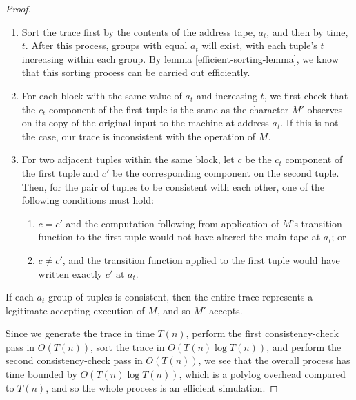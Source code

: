 \documentclass[english]{article}
\theoremstyle{plain}
\theoremstyle{definition}
\theoremstyle{plain}
\begin{document}
\begin{proof}
  \begin{enumerate}
  \item Sort the trace first by the contents of the address tape,
    $a_t$, and then by time, $t$. After this process, groups with
    equal $a_t$ will exist, with each tuple's $t$ increasing within
    each group. By lemma \ref{efficient-sorting-lemma}, we know that
    this sorting process can be carried out efficiently.
  \item For each block with the same value of $a_t$ and increasing
    $t$, we first check that the $c_t$ component of the first tuple is
    the same as the character $M'$ observes on its copy of the
    original input to the machine at address $a_t$. If this is not the
    case, our trace is inconsistent with the operation of $M$.
  \item For two adjacent tuples within the same block, let $c$ be the
    $c_t$ component of the first tuple and $c'$ be the corresponding
    component on the second tuple. Then, for the pair of tuples to be
    consistent with each other, one of the following conditions must
    hold:
    \begin{enumerate}
    \item $c = c'$ and the computation following from application of
      $M$'s transition function to the first tuple would not have
      altered the main tape at $a_t$; or
    \item $c \neq c'$, and the transition function applied to the
      first tuple would have written exactly $c'$ at $a_t$.
    \end{enumerate}
  \end{enumerate}

  If each $a_t$-group of tuples is consistent, then the entire trace
  represents a legitimate accepting execution of $M$, and so $M'$
  accepts.

  Since we generate the trace in time $T(n)$, perform the first
  consistency-check pass in $O(T(n))$, sort the trace in $O(T(n) \log
  T(n))$, and perform the second consistency-check pass in $O(T(n))$,
  we see that the overall process has time bounded by $O(T(n) \log
  T(n))$, which is a polylog overhead compared to $T(n)$, and so the
  whole process is an efficient simulation.
\end{proof}



\end{document}
